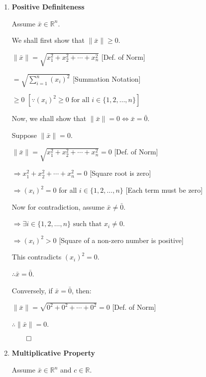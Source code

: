 
\begin{proofbox}
\begin{enumerate}[label=\arabic*., series=normprops]
    \item \textbf{Positive Definiteness}
    
    Assume $\bar{x} \in \mathbb{R}^n$.

    We shall first show that $\|\bar{x}\| \geq 0$.

    \quad $\|\bar{x}\| = \sqrt{x_1^2 + x_2^2 + \cdots + x_n^2}$ \hfill [Def. of Norm]

    \quad $= \sqrt{\sum_{i=1}^n (x_i)^2}$ \hfill [Summation Notation]

    \quad $\geq 0$ \hfill $[ \because (x_i)^2 \geq 0 \text{ for all } i \in \{1, 2, \ldots, n\}]$

    Now, we shall show that $\|\bar{x}\| = 0 \Leftrightarrow \bar{x} = \bar{0}$.

    Suppose $\|\bar{x}\| = 0$.

    \quad $\|\bar{x}\| = \sqrt{x_1^2 + x_2^2 + \cdots + x_n^2} = 0$ \hfill [Def. of Norm]

    \quad $\Rightarrow x_1^2 + x_2^2 + \cdots + x_n^2 = 0$ \hfill [Square root is zero]

    \quad $\Rightarrow (x_i)^2 = 0$ for all $i \in \{1, 2, \ldots, n\}$ \hfill [Each term must be zero]

    Now for contradiction, assume $\bar{x} \neq \bar{0}$.

    \quad $\Rightarrow \exists i \in \{1, 2, \ldots, n\} \text{ such that } x_i \neq 0$.

    \quad $\Rightarrow (x_i)^2 > 0$ \hfill [Square of a non-zero number is positive]

    \quad This contradicts $(x_i)^2 = 0$.

    \quad $\therefore \bar{x} = \bar{0}$.

    Conversely, if $\bar{x} = \bar{0}$, then:

    \quad $\|\bar{x}\| = \sqrt{0^2 + 0^2 + \cdots + 0^2} = 0$ \hfill [Def. of Norm]

    \quad $\therefore \|\bar{x}\| = 0$.

    \hfill $\qed$

    \item \textbf{Multiplicative Property}
    
    Assume $\bar{x} \in \mathbb{R}^n$ and $c \in \mathbb{R}$.


\end{enumerate}
\end{proofbox}
